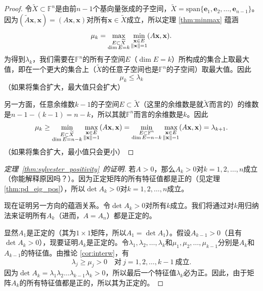 \begin{proof}
  令$\widetilde{X}\subset\mathbb{F}^n$是由前$n-1$个基向量张成的子空间，$\widetilde{X}=$\linebreak $\mathrm{span}\{\mathbf{e}_{1},\mathbf{e}_{2},\ldots,\mathbf{e}_{n-1}\}$。因为$(\widetilde{A}\mathbf{x},\mathbf{x})=(A\mathbf{x},\mathbf{x})$对所有$\mathbf{x}\in\widetilde{X}$成立，所以定理 \ref{thm:minmax} 蕴涵
  \[\mu_k=\max_{\begin{subarray}{c}E\subset\widetilde{X}\\\dim E=k\end{subarray}}\min_{\begin{subarray}{c}\mathbf{x}\in E\\\|\mathbf{x}\|=1\end{subarray}}(A\mathbf{x},\mathbf{x}).\]
  为得到$\lambda_k$，我们需要在$\mathbb{F}^n$的所有子空间$E$（$\dim E=k$）所构成的集合上取最大值，即在一个更大的集合上（$\widetilde{X}$的任意子空间也是$\mathbb{F}^n$的子空间）取最大值。因此\[\mu_k\le\lambda_k\]（如果将集合扩大，最大值只会扩大）

  另一方面，任意余维数$k-1$的子空间$E\subset \widetilde{X}$（这里的余维数是就$\widetilde{X}$而言的）的维数是$n-1-(k-1)=n-k$，所以其就$\mathbb{F}^n$而言的余维数是$k$。因此
  \[\mu_k \ge \min_{\begin{subarray}{c}E\subset\widetilde{X}\\\dim E=n-k\end{subarray}}\max_{\begin{subarray}{c}\mathbf{x}\in E\\\|\mathbf{x}\|=1\end{subarray}}(A\mathbf{x},\mathbf{x}) = \min_{\begin{subarray}{c}E\subset\mathbb{F}^n\\\dim E=n-k\end{subarray}}\max_{\begin{subarray}{c}\mathbf{x}\in E\\\|\mathbf{x}\|=1\end{subarray}}(A\mathbf{x},\mathbf{x})=\lambda_{k+1}.\]
  （如果将集合扩大，最小值只会更小）
\end{proof}

\begin{proof}[定理~\ref{thm:sylvester_positivity}~的证明]
  若$A>0$，那么$A_k>0$对$k=1,2,\dots,n$成立（你能解释原因吗？）。因为正定矩阵的所有特征值都是正的（见定理 \ref{thm:pd_eig_pos}），所以$\det A_k>0$对$k=1,2,\dots,n$成立。

  现在证明另一方向的蕴涵关系。令$\det A_k>0$对所有$k$成立。我们将通过对$k$用归纳法来证明所有$A_k$（进而，$A=A_n$）都是正定的。

  显然$A_1$是正定的（其为$1\times 1$矩阵，所以$A_1=\det A_1$）。假设$A_{k-1}>0$（且有$\det A_k>0$），现要证明$A_k$是正定的。令$\lambda_{1},\lambda_{2},\ldots,\lambda_{k}$和$\mu_{1},\mu_{2},\ldots,\mu_{k-1}$分别是$A_k$和$A_{k-1}$的特征值。由推论 \ref{cor:interw}，有\[\lambda_j\ge\mu_j>0\quad \text{对}~j=1,2,\dots,k-1~\text{成立}.\]
  因为$\det A_k=\lambda_1\lambda_2\dots\lambda_{k-1}\lambda_k>0$，所以最后一个特征值$\lambda_k$必为正。因此，由于矩阵$A_k$的所有特征值都是正的，所以其为正定的。
\end{proof}

